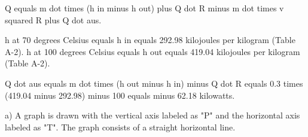 Q equals m dot times (h in minus h out) plus Q dot R minus m dot times v squared R plus Q dot aus.  

h at 70 degrees Celsius equals h in equals 292.98 kilojoules per kilogram (Table A-2).  
h at 100 degrees Celsius equals h out equals 419.04 kilojoules per kilogram (Table A-2).  

Q dot aus equals m dot times (h out minus h in) minus Q dot R equals 0.3 times (419.04 minus 292.98) minus 100 equals minus 62.18 kilowatts.

a) A graph is drawn with the vertical axis labeled as "P" and the horizontal axis labeled as "T". The graph consists of a straight horizontal line.